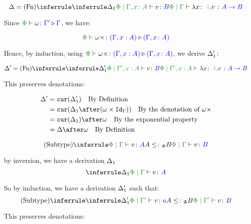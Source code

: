 \documentclass{report}
\begin{document}
    \begin{equation}
        \D = \ntreeruleI{Fn}{
            \treeruleI{\D_1}{\etyperelation{\P}{\gax}{v}{B}}
        }{\gpetyperelation{\lam{x}{A}{v}}{\ab}}
    \end{equation}

    Since $\ewrel{\P}{\w}{\G'}{\G}$, we have:

    \begin{equation}
        \ewrel{\P}{\w\x}{(\G,x:  A)}{(\gax)}
    \end{equation}

    Hence, by induction, using $\ewrel{\P}{\w\x}{(\G,x:  A)}{(\gax)}$, we derive $\Delta_1'$:

    \begin{equation}
        \D' = \ntreeruleI{Fn}{
            \treeruleI{\D_1'}{\etyperelation{\P}{\G',x: A}{v}{B}}
        }{\etyperelation{\P}{\G',x: A}{\lam{x}{A}{v}}{\ab}}
    \end{equation}

    This preserves denotations:


    \begin{align*}
    \D' & = \cur{\D_1'} \qt{By Definition}\\
    & = \cur{\D_1\after(\w\times \idg)}\qt{By the denotation of $\w\x$} \\
    &= \cur{\D_1}\after\w\qt{By the exponential property}\\
    &= \D\after \w \qt{By Definition}
    \end{align*}



    \begin{equation}
        \ntreeruleII{Subtype}{\gpetyperelation{v}{A}}{ A\subtypep B}{\gpetyperelation{v}{B}}
    \end{equation}

    by inversion, we have a derivation $\Delta_1$
    \begin{equation}
        \treeruleI{\D_1}{\gpetyperelation{v}{A}}
    \end{equation}

    So by induction, we have a derivation $\Delta_1'$ such that:
    \begin{equation}
        \ntreeruleII{Subtype}{\treeruleI{\D_1'}{\etyperelation{\P}{\G'}{v}{a}}}{ A \subtypep B}{\etyperelation{\P}{\G'}{v}{B}}
    \end{equation}

    This preserves denotations:
\end{document}
